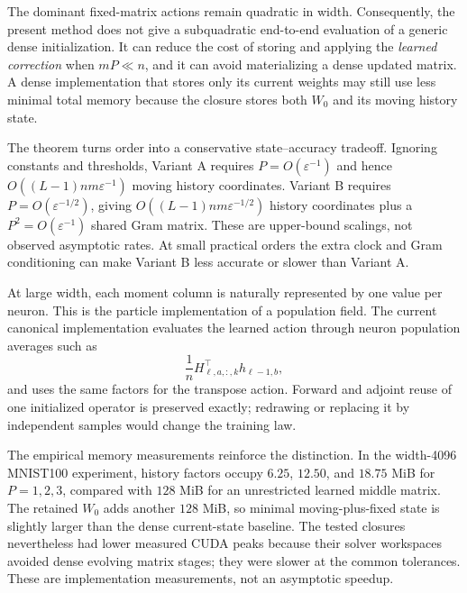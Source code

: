 The dominant fixed-matrix actions remain quadratic in width.  Consequently,
the present method does not give a subquadratic end-to-end evaluation of a
generic dense initialization.  It can reduce the cost of storing and applying
the \emph{learned correction} when $mP\ll n$, and it can avoid materializing a
dense updated matrix.  A dense implementation that stores only its current
weights may still use less minimal total memory because the closure stores
both $W_0$ and its moving history state.

The theorem turns order into a conservative state--accuracy tradeoff.  Ignoring
constants and thresholds, Variant A requires $P=O(\varepsilon^{-1})$ and hence
$O((L-1)nm\varepsilon^{-1})$ moving history coordinates.  Variant B requires
$P=O(\varepsilon^{-1/2})$, giving
$O((L-1)nm\varepsilon^{-1/2})$ history coordinates plus a
$P^2=O(\varepsilon^{-1})$ shared Gram matrix.  These are upper-bound scalings,
not observed asymptotic rates.  At small practical orders the extra clock and
Gram conditioning can make Variant B less accurate or slower than Variant A.

At large width, each moment column is naturally represented by one value per
neuron.  This is the particle implementation of a population field.  The
current canonical implementation evaluates the learned action through neuron
population averages such as
\begin{equation}
 \frac1nH_{\ell,a,:,k}^\top h_{\ell-1,b},
\end{equation}
and uses the same factors for the transpose action.  Forward and adjoint reuse
of one initialized operator is preserved exactly; redrawing or replacing it
by independent samples would change the training law.

The empirical memory measurements reinforce the distinction.  In the
width-4096 MNIST100 experiment, history factors occupy
$6.25$, $12.50$, and $18.75$ MiB for $P=1,2,3$, compared with $128$ MiB for an
unrestricted learned middle matrix.  The retained $W_0$ adds another
$128$ MiB, so minimal moving-plus-fixed state is slightly larger than the
dense current-state baseline.  The tested closures nevertheless had lower
measured CUDA peaks because their solver workspaces avoided dense evolving
matrix stages; they were slower at the common tolerances.  These are
implementation measurements, not an asymptotic speedup.

